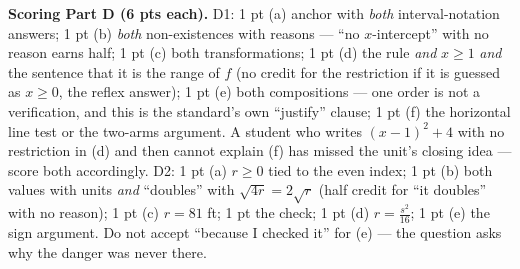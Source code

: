 \documentclass[10pt]{article}
\begin{document}
\begin{teachernote}
\textbf{Scoring Part D (6 pts each).} D1: 1 pt (a) anchor with \emph{both} interval-notation answers;
1 pt (b) \emph{both} non-existences with reasons --- ``no $x$-intercept'' with no reason earns half;
1 pt (c) both transformations; 1 pt (d) the rule \emph{and} $x\ge1$ \emph{and} the sentence that it is
the range of $f$ (no credit for the restriction if it is guessed as $x\ge0$, the reflex answer);
1 pt (e) both compositions --- one order is not a verification, and this is the standard's own
``justify'' clause; 1 pt (f) the horizontal line test or the two-arms argument. A student who writes
$(x-1)^2+4$ with no restriction in (d) and then cannot explain (f) has missed the unit's closing
idea --- score both accordingly. D2: 1 pt (a) $r\ge0$ tied to the even index; 1 pt (b) both values
with units \emph{and} ``doubles'' with $\sqrt{4r}=2\sqrt{r}$ (half credit for ``it doubles'' with no
reason); 1 pt (c) $r=81$ ft; 1 pt the check; 1 pt (d) $r=\frac{s^2}{16}$; 1 pt (e) the sign argument.
Do not accept ``because I checked it'' for (e) --- the question asks why the danger was never there.
\end{teachernote}
\end{document}
